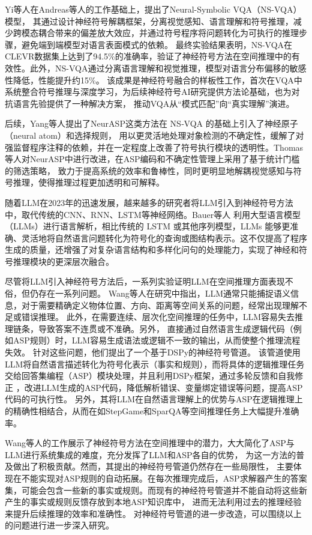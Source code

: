 Yi等人\cite{yi2019neuralsymbolicvqadisentanglingreasoning}在Andreas等人的工作基础上，提出了Neural-Symbolic VQA（NS-VQA）模型，
其通过设计神经符号解耦框架，分离视觉感知、语言理解和符号推理，减少跨模态耦合带来的偏差放大效应，并通过符号程序将问题转化为可执行的推理步骤，避免端到端模型对语言表面模式的依赖。
最终实验结果表明，NS-VQA在CLEVR数据集上达到了94.5\%的准确率，验证了神经符号方法在空间推理中的有效性。此外，NS-VQA通过分离语言理解和视觉推理，模型对语言分布偏移的敏感性降低，性能提升约15\%。
该成果是神经符号融合的样板性工作，首次在VQA中系统整合符号推理与深度学习，为后续神经符号AI研究提供方法论基础，也为对抗语言先验提供了一种解决方案，
推动VQA从“模式匹配”向“真实理解”演进。

后续，Yang等人\cite{yang2020neurasp}提出了NeurASP这类方法在 NS‐VQA 的基础上引入了神经原子（neural atom）和选择规则，
用以更灵活地处理对象检测的不确定性，缓解了对强监督程序注释的依赖，并在一定程度上改善了符号执行模块的透明性。Thomas等人\cite{eiter2022neuro}对NeurASP中进行改进，在ASP编码和不确定性管理上采用了基于统计门槛的筛选策略，
致力于提高系统的效率和鲁棒性，同时更明显地解耦视觉感知与符号推理，使得推理过程更加透明和可解释。

随着LLM在2023年的迅速发展，越来越多的研究者将LLM引入到神经符号方法中，取代传统的CNN、RNN、LSTM等神经网络。Bauer\cite{bauer2023neuro}等人
利用大型语言模型（LLMs）进行语言解析，相比传统的 LSTM 或其他序列模型，LLMs 能够更准确、灵活地将自然语言问题转化为符号化的查询或图结构表示。这不仅提高了程序生成的质量，还增强了对复杂语言结构和多样化问句的处理能力，实现了神经和符号推理模块的更深层次融合。

尽管将LLM引入神经符号方法后，一系列实验证明LLM在空间推理方面表现不俗，但仍存在一系列问题。
Wang等人\cite{wang2024dspy}在研究中指出，LLM通常只能捕捉语义信息，对于需要精确定义物体位置、方向、距离等空间关系的问题，经常出现理解不足或错误推理。
此外，在需要连续、层次化空间推理的任务中，LLM容易失去推理链条，导致答案不连贯或不准确。另外，
直接通过自然语言生成逻辑代码（例如ASP规则）时，LLM容易生成语法或逻辑不一致的输出，从而使整个推理流程失效。
针对这些问题，他们提出了一个基于DSPy的神经符号管道。
该管道使用LLM将自然语言描述转化为符号化表示（事实和规则），而将具体的逻辑推理任务交给回答集编程（ASP）模块处理，并且利用DSPy框架，通过多轮反馈和自我修正
，改进LLM生成的ASP代码，降低解析错误、变量绑定错误等问题，提高ASP代码的可执行性。
另外，其将LLM在自然语言理解上的优势与ASP在逻辑推理上的精确性相结合，从而在如StepGame和SparQA等空间推理任务上大幅提升准确率。

Wang等人\cite{wang2024dspy}的工作展示了神经符号方法在空间推理中的潜力，大大简化了ASP与LLM进行系统集成的难度，充分发挥了LLM和ASP各自的优势，
为这一方法的普及做出了积极贡献。然而，其提出的神经符号管道仍然存在一些局限性，
主要体现在不能实现对ASP规则的自动拓展。在每次推理完成后，ASP求解器产生的答案集，可能会包含一些新的事实或规则。而现有的神经符号管道并不能自动将这些新产生的事实或规则反馈存放到本地ASP知识库中，
进而无法利用过去的推理经验来提升后续推理的效率和准确性。
对神经符号管道的进一步改造，可以围绕以上的问题进行进一步深入研究。

